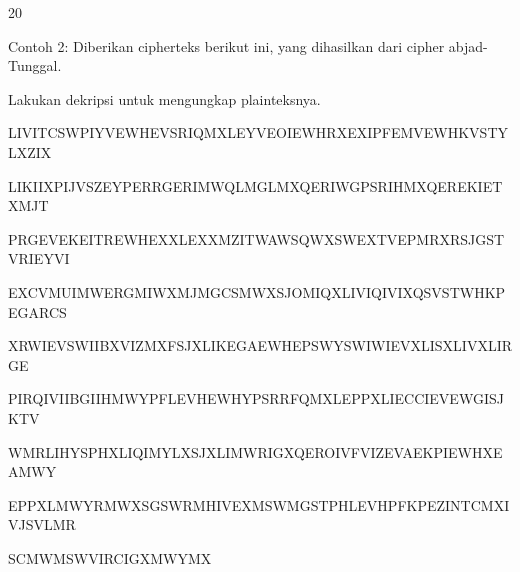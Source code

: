 \documentclass{article}
\begin{document}

20

Contoh 2: Diberikan cipherteks berikut ini, yang dihasilkan dari cipher abjad-Tunggal. 

Lakukan dekripsi untuk mengungkap plainteksnya.

 LIVITCSWPIYVEWHEVSRIQMXLEYVEOIEWHRXEXIPFEMVEWHKVSTYLXZIX

LIKIIXPIJVSZEYPERRGERIMWQLMGLMXQERIWGPSRIHMXQEREKIETXMJT

PRGEVEKEITREWHEXXLEXXMZITWAWSQWXSWEXTVEPMRXRSJGSTVRIEYVI

EXCVMUIMWERGMIWXMJMGCSMWXSJOMIQXLIVIQIVIXQSVSTWHKPEGARCS

XRWIEVSWIIBXVIZMXFSJXLIKEGAEWHEPSWYSWIWIEVXLISXLIVXLIRGE

PIRQIVIIBGIIHMWYPFLEVHEWHYPSRRFQMXLEPPXLIECCIEVEWGISJKTV

WMRLIHYSPHXLIQIMYLXSJXLIMWRIGXQEROIVFVIZEVAEKPIEWHXEAMWY

EPPXLMWYRMWXSGSWRMHIVEXMSWMGSTPHLEVHPFKPEZINTCMXIVJSVLMR

SCMWMSWVIRCIGXMWYMX
\end{document}
